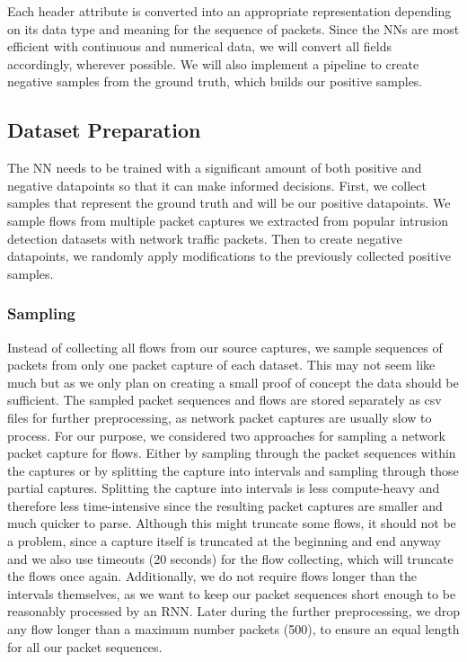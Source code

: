 \documentclass[
	ngerman,
	ruledheaders=section,%
	class=report,%
	thesis={type=bachelor},%
	accentcolor=9c,%
	custommargins=true,%
	marginpar=false,%
	parskip=half-,%
	fontsize=11pt,%
]{tudapub}
\begin{document}
Each header attribute is converted into an appropriate representation depending on its data type and meaning for the sequence of packets.
Since the NNs are most efficient with continuous and numerical data, we will convert all fields accordingly, wherever possible.
We will also implement a pipeline to create negative samples from the ground truth, which builds our positive samples.

\subsection{Dataset Preparation}
\label{sec:datasetPrep}

The NN needs to be trained with a significant amount of both positive and negative datapoints so that it can make informed decisions.
First, we collect samples that represent the ground truth and will be our positive datapoints.
We sample flows from multiple packet captures we extracted from popular intrusion detection datasets with network traffic packets.
Then to create negative datapoints, we randomly apply modifications to the previously collected positive samples.

\subsubsection{Sampling}
\label{sec:sampling}

Instead of collecting all flows from our source captures, we sample sequences of packets from only one packet capture of each dataset.
This may not seem like much but as we only plan on creating a small proof of concept the data should be sufficient.
The sampled packet sequences and flows are stored separately as csv files for further preprocessing, as network packet captures are usually slow to process.
For our purpose, we considered two approaches for sampling a network packet capture for flows.
Either by sampling through the packet sequences within the captures or by splitting the capture into intervals and sampling through those partial captures.
Splitting the capture into intervals is less compute-heavy and therefore less time-intensive since the resulting packet captures are smaller and much quicker to parse.
Although this might truncate some flows, it should not be a problem, since a capture itself is truncated at the beginning and end anyway
and we also use timeouts (20 seconds) for the flow collecting, which will truncate the flows once again.
Additionally, we do not require flows longer than the intervals themselves,
as we want to keep our packet sequences short enough to be reasonably processed by an RNN.
Later during the further preprocessing, we drop any flow longer than a maximum number packets (500), to ensure an equal length for all our packet sequences.
\end{document}
